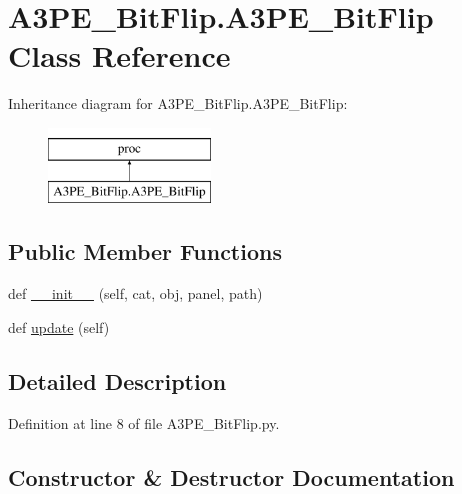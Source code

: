 \hypertarget{classA3PE__BitFlip_1_1A3PE__BitFlip}{}\section{A3\+P\+E\+\_\+\+Bit\+Flip.\+A3\+P\+E\+\_\+\+Bit\+Flip Class Reference}
\label{classA3PE__BitFlip_1_1A3PE__BitFlip}
Inheritance diagram for A3\+P\+E\+\_\+\+Bit\+Flip.\+A3\+P\+E\+\_\+\+Bit\+Flip\+:\begin{figure}[H]
\begin{center}
\leavevmode
\includegraphics[height=2.000000cm]{classA3PE__BitFlip_1_1A3PE__BitFlip}
\end{center}
\end{figure}
\subsection*{Public Member Functions}
\begin{DoxyCompactItemize}
\item 
def \hyperlink{classA3PE__BitFlip_1_1A3PE__BitFlip_a3794bca914e1f66f162eff033c70b915}{\+\_\+\+\_\+init\+\_\+\+\_\+} (self, cat, obj, panel, path)
\item 
def \hyperlink{classA3PE__BitFlip_1_1A3PE__BitFlip_a6259691e444dd8ca8add74ddb359e4bc}{update} (self)
\end{DoxyCompactItemize}


\subsection{Detailed Description}


Definition at line 8 of file A3\+P\+E\+\_\+\+Bit\+Flip.\+py.



\subsection{Constructor \& Destructor Documentation}
\mbox{\label{classA3PE__BitFlip_1_1A3PE__BitFlip_a3794bca914e1f66f162eff033c70b915}} 
